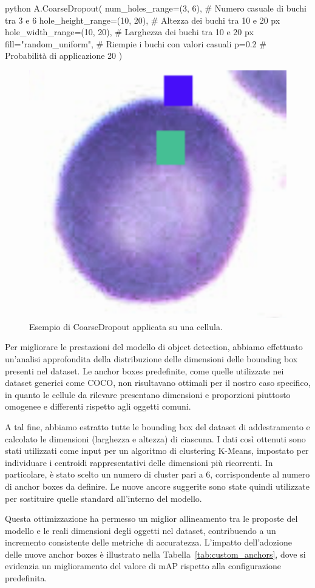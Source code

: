 \documentclass[minted, draw]{../tex/hebdomon}
\begin{document}
\begin{code}{python}
A.CoarseDropout(
    num_holes_range=(3, 6),              # Numero casuale di buchi tra 3 e 6
    hole_height_range=(10, 20),          # Altezza dei buchi tra 10 e 20 px
    hole_width_range=(10, 20),           # Larghezza dei buchi tra 10 e 20 px
    fill="random_uniform",               # Riempie i buchi con valori casuali
    p=0.2                               # Probabilità di applicazione 20%
)
\end{code}


%
\begin{figure}[H]
	\centering
	\includegraphics[width=.2\linewidth]{figures/corse_result.png}
	\caption{Esempio di CoarseDropout applicata su una cellula.}
	\label{fig:coarse_dropout_example}
\end{figure}
%



Per migliorare le prestazioni del modello di object detection, abbiamo effettuato un’analisi approfondita della distribuzione delle dimensioni delle bounding box presenti nel dataset. Le anchor boxes predefinite, come quelle utilizzate nei dataset generici come COCO, non risultavano ottimali per il nostro caso specifico, in quanto le cellule da rilevare presentano dimensioni e proporzioni piuttosto omogenee e differenti rispetto agli oggetti comuni.

A tal fine, abbiamo estratto tutte le bounding box del dataset di addestramento e calcolato le dimensioni (larghezza e altezza) di ciascuna. I dati così ottenuti sono stati utilizzati come input per un algoritmo di clustering K-Means, impostato per individuare i centroidi rappresentativi delle dimensioni più ricorrenti. In particolare, è stato scelto un numero di cluster pari a 6, corrispondente al numero di anchor boxes da definire. Le nuove ancore suggerite sono state quindi utilizzate per sostituire quelle standard all’interno del modello.

Questa ottimizzazione ha permesso un miglior allineamento tra le proposte del modello e le reali dimensioni degli oggetti nel dataset, contribuendo a un incremento consistente delle metriche di accuratezza. L'impatto dell’adozione delle nuove anchor boxes è illustrato nella Tabella~\ref{tab:custom_anchors}, dove si evidenzia un miglioramento del valore di mAP rispetto alla configurazione predefinita.
\end{document}

